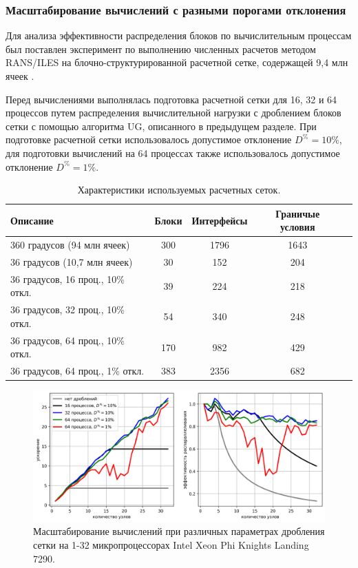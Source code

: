 \subsubsection{Масштабирование вычислений с разными порогами отклонения}

Для анализа эффективности распределения блоков по вычислительным процессам был поставлен эксперимент по выполнению численных  расчетов методом RANS/ILES на блочно-структурированной расчетной сетке, содержащей 9,4 млн ячеек \cite{Savin2019RANS}.

Перед вычислениями выполнялась подготовка расчетной сетки для 16, 32 и 64 процессов путем распределения вычислительной нагрузки с дроблением блоков сетки с помощью алгоритма UG, описанного в предыдущем разделе.
При подготовке расчетной сетки использовалось допустимое отклонение $D^{\%} = 10\%$, для подготовки вычислений на 64 процессах также использовалось допустимое отклонение $D^{\%} = 1\%$.

\begin{table}[!ht]
\centering
\singlespacing
{}\caption{Характеристики используемых расчетных сеток.}
\bigskip
\label{tbl:text_2_withcut}
\begin{tabular}{ | l | c | c | c | c | }
  \hline
  Описание & Блоки & Интерфейсы & Граничые условия \\ \hline\hline
  360 градусов (94 млн ячеек) & 300 & 1796 & 1643 \\ \hline
  36 градусов (10,7 млн ячеек) & 30 & 152 & 204 \\ \hline\hline
  36 градусов, 16 проц., 10\% откл. & 39 & 224 & 218 \\ \hline
  36 градусов, 32 проц., 10\% откл. & 54 & 340 & 248 \\ \hline
  36 градусов, 64 проц., 10\% откл. & 170 & 982 & 429 \\ \hline\hline
  36 градусов, 64 проц., 1\% откл. & 383 & 2356 & 682 \\ \hline
\end{tabular}
\end{table}

\begin{figure}[ht]
\centering
\includegraphics[width=1.0\textwidth]{./pics/text_2_withcut/scaling3.png}
\singlespacing
{}\caption{Масштабирование вычислений при различных параметрах дробления сетки на 1-32 микропроцессорах Intel Xeon Phi Knights Landing 7290.}
\label{fig:text_2_withcut_scaling3}
\end{figure}

